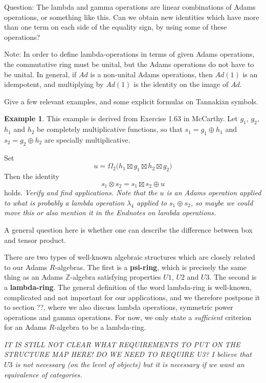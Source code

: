 \documentclass[a4paper]{article}
\theoremstyle{definition}
\newtheorem{example}{Example}[section]
\theoremstyle{remark}
\newcommand{\Z}{\mathbb{Z}}
\newcommand{\defhl}[1]{\textbf{#1}}
\begin{document}
Question: The lambda and gamma operations are linear combinations of Adams operations, or something like this. Can we obtain new identities which have more than one term on each side of the equality sign, by using some of these operations?


Note: In order to define lambda-operations in terms of given Adams operations, the commutative ring must be unital, but the Adams operations do not have to be unital. In general, if $Ad$ is a non-unital Adams operations, then $Ad(1)$ is an idempotent, and multiplying by $Ad(1)$ is the identity on the image of $Ad$. 

Give a few relevant examples, and some explicit formulas on Tannakian symbols.

\begin{example}
This example is derived from Exercise 1.63 in McCarthy. Let $g_1$, $g_2$, $h_1$ and $h_2$ be completely multiplicative functions, so that $s_1 = g_1 \oplus h_1$ and $s_2 = g_2 \oplus h_2$ are specially multiplicative.

Set
$$  u = \Omega_2 \big(  h_1 \boxtimes g_1 \boxtimes h_2 \boxtimes g_2   \big)  $$
Then the identity 
$$   s_1 \otimes s_2 = s_1 \boxtimes s_2 \oplus u  $$
holds. \emph{Verify and find applications. Note that the $u$ is an Adams operation applied to what is probably a lambda operation $\lambda_4$ applied to $s_1 \oplus s_2$, so maybe we could move this or also mention it in the Endnotes on lambda operations.}

A general question here is whether one can describe the difference between box and tensor product.

\end{example}


There are two types of well-known algebraic structures which are closely related to our Adams $R$-algebras. The first is a  \defhl{psi-ring}, which is precisely the same thing as an Adams $\Z$-algebra satisfying properties $U1$, $U2$ and $U3$. The second is a \defhl{lambda-ring}. The general definition of the word lambda-ring is well-known, complicated and not important for our applications, and we therefore postpone it to section ??, where we also discuss lambda operations, symmetric power operations and gamma operations. For now, we only state a \emph{sufficient} criterion for an Adams $R$-algebra to be a lambda-ring.

\emph{IT IS STILL NOT CLEAR WHAT REQUIREMENTS TO PUT ON THE STRUCTURE MAP HERE! DO WE NEED TO REQUIRE U3? I believe that $U3$ is not necessary (on the level of objects) but it is necessary if we want an equivalence of categories.}
\end{document}
